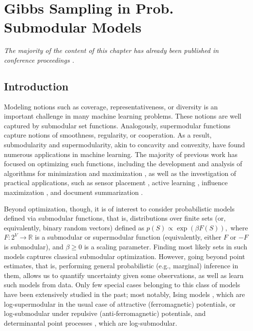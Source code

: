 \chapter{Gibbs Sampling in Prob. Submodular Models} \label{ch:gibbs}

\emph{The majority of the content of this chapter has already been published in conference proceedings \citep{gotovos15}.}

\section{Introduction}
Modeling notions such as coverage, representativeness, or diversity is an important challenge in many machine learning problems.
These notions are well captured by submodular set functions.
Analogously, supermodular functions capture notions of smoothness, regularity, or cooperation. 
As a result, submodularity and supermodularity, akin to concavity and convexity, have found numerous applications in machine learning.
The majority of previous work has focused on optimizing such functions, including the development and analysis of algorithms for minimization \cite{fujishige05} and maximization \cite{nemhauser78,feige07}, as well as the investigation of practical applications, such as sensor placement \cite{krause06}, active learning \cite{golovin11}, influence maximization \cite{kempe03}, and document summarization \cite{lin11}.

Beyond optimization, though, it is of interest to consider probabilistic models defined via submodular functions, that is, distributions over finite sets (or, equivalently, binary random vectors) defined as $p(S) \propto \exp(\beta F(S)),$ where $F : 2^V \to \mathbb{R}$ is a submodular or supermodular function (equivalently, either $F$ or $-F$ is submodular), and $\beta \geq 0$ is a scaling parameter.
Finding most likely sets in such models captures classical submodular optimization.
However, going beyond point estimates, that is, performing general probabilistic (e.g., marginal) inference in them, allows us to quantify uncertainty given some observations, as well as learn such models from data.
Only few special cases belonging to this class of models have been extensively studied in the past; most notably, Ising models \cite{koller09}, which are log-supermodular in the usual case of attractive (ferromagnetic) potentials, or log-submodular under repulsive (anti-ferromagnetic) potentials, and determinantal point processes \cite{kulesza12}, which are log-submodular.

